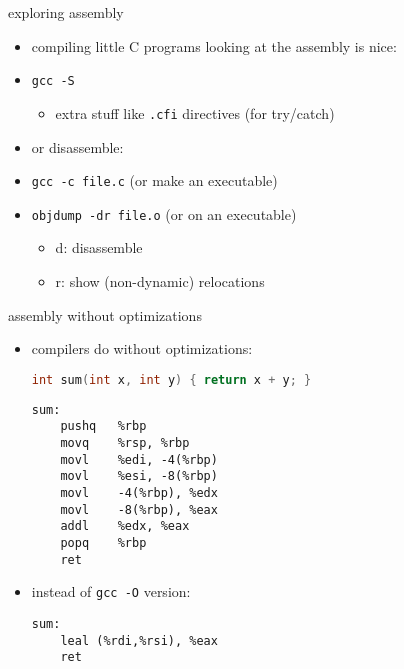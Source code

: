 \begin{frame}{exploring assembly}
\begin{itemize}
\item compiling little C programs looking at the assembly is nice:
\item {\tt gcc -S }
    \begin{itemize}
    \item extra stuff like {\tt .cfi} directives (for try/catch)
    \end{itemize}
\vspace{.5cm}
\item or disassemble:
\item {\tt gcc  -c file.c} (or make an executable)
\item {\tt objdump -dr file.o} (or on an executable) 
    \begin{itemize}
    \item d: disassemble
    \item r: show (non-dynamic) relocations
    \end{itemize}
\end{itemize}
\end{frame}

\begin{frame}[fragile,label=noOpt]{assembly without optimizations}
\begin{itemize}
\item compilers do  without optimizations:
\begin{lstlisting}[language=C, style=smaller]
int sum(int x, int y) { return x + y; }
\end{lstlisting}
\vspace{-.125cm}
\begin{lstlisting}[language=myasm,style=smaller]
sum:
    pushq   %rbp
    movq    %rsp, %rbp
    movl    %edi, -4(%rbp)
    movl    %esi, -8(%rbp)
    movl    -4(%rbp), %edx
    movl    -8(%rbp), %eax
    addl    %edx, %eax
    popq    %rbp
    ret
\end{lstlisting}
\vspace{-.3cm}
\item instead of {\tt gcc -O} version:
\vspace{-.1cm}
\begin{lstlisting}[language=myasm,style=smaller]
sum:
    leal (%rdi,%rsi), %eax
    ret
\end{lstlisting}
\end{itemize}
\end{frame}

